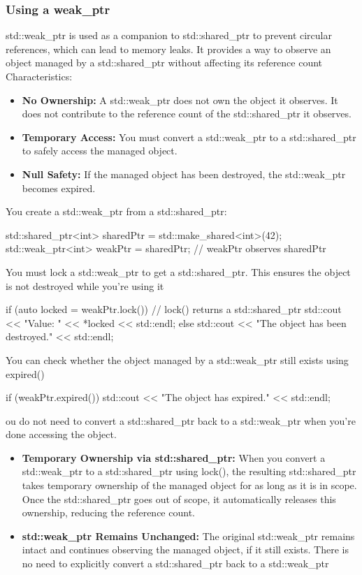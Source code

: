 \documentclass{report}
\begin{document}
\subsubsection{Using a weak\_ptr}
\bigbreak \noindent 
std::weak\_ptr is used as a companion to std::shared\_ptr to prevent circular references, which can lead to memory leaks. It provides a way to observe an object managed by a std::shared\_ptr without affecting its reference count
\bigbreak \noindent 
Characteristics:
\begin{itemize}
    \item \textbf{No Ownership:} A std::weak_ptr does not own the object it observes. It does not contribute to the reference count of the std::shared_ptr it observes.
    \item \textbf{Temporary Access:} You must convert a std::weak_ptr to a std::shared_ptr to safely access the managed object.
    \item \textbf{Null Safety:} If the managed object has been destroyed, the std::weak_ptr becomes expired.
\end{itemize}
\bigbreak \noindent 
You create a std::weak\_ptr from a std::shared\_ptr:
\bigbreak \noindent 
\begin{cppcode}
std::shared_ptr<int> sharedPtr = std::make_shared<int>(42);
std::weak_ptr<int> weakPtr = sharedPtr; // weakPtr observes sharedPtr
\end{cppcode}
\bigbreak \noindent 
You must lock a std::weak\_ptr to get a std::shared\_ptr. This ensures the object is not destroyed while you're using it
\bigbreak \noindent 
\begin{cppcode}
if (auto locked = weakPtr.lock()) { // lock() returns a std::shared_ptr
    std::cout << "Value: " << *locked << std::endl;
} else {
    std::cout << "The object has been destroyed." << std::endl;
}
\end{cppcode}
\bigbreak \noindent 
You can check whether the object managed by a std::weak\_ptr still exists using expired()
\bigbreak \noindent 
\begin{cppcode}
if (weakPtr.expired()) {
    std::cout << "The object has expired." << std::endl;
}
\end{cppcode}
\bigbreak \noindent 
ou do not need to convert a std::shared\_ptr back to a std::weak\_ptr when you're done accessing the object.
\begin{itemize}
    \item \textbf{Temporary Ownership via std::shared\_ptr:} When you convert a std::weak\_ptr to a std::shared\_ptr using lock(), the resulting std::shared\_ptr takes temporary ownership of the managed object for as long as it is in scope. Once the std::shared\_ptr goes out of scope, it automatically releases this ownership, reducing the reference count.
    \item \textbf{std::weak\_ptr Remains Unchanged:} The original std::weak\_ptr remains intact and continues observing the managed object, if it still exists. There is no need to explicitly convert a std::shared\_ptr back to a std::weak\_ptr
\end{itemize}
\end{document}
